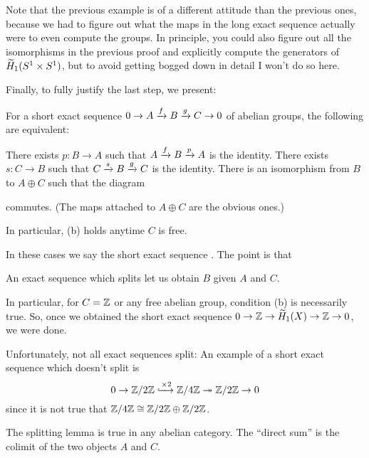 Note that the previous example is of a different attitude than the previous ones,
because we had to figure out what the maps in the long exact sequence actually were
to even compute the groups.
In principle, you could also figure out all the isomorphisms in the previous proof
and explicitly compute the generators of $\widetilde H_1(S^1 \times S^1)$,
but to avoid getting bogged down in detail I won't do so here.

Finally, to fully justify the last step, we present:
\begin{lemma}
	\label{lem:split_exact}
	For a short exact sequence $0 \to A \xrightarrow{f} B \xrightarrow{g} C \to 0$
	of abelian groups, the following are equivalent:
	\begin{enumerate}[(a)]
		\ii There exists $p : B \to A$ such that $A \xrightarrow{f} B \xrightarrow{p} A$ is the identity.
		\ii There exists $s : C \to B$ such that $C \xrightarrow{s} B \xrightarrow{g} C$ is the identity.
		\ii There is an isomorphism from $B$ to $A \oplus C$ such that the diagram
		\begin{center}
		\end{center}
		commutes. (The maps attached to $A \oplus C$ are the obvious ones.)
	\end{enumerate}
	In particular, (b) holds anytime $C$ is free.
\end{lemma}
In these cases we say the short exact sequence . The point is that
\begin{moral}
	An exact sequence which splits let us obtain $B$ given $A$ and $C$.
\end{moral}
In particular, for $C = \mathbb Z$ or any free abelian group,
condition (b) is necessarily true.
So, once we obtained the short exact sequence $0 \to \mathbb Z \to \widetilde H_1(X) \to \mathbb Z \to 0$,
we were done.
\begin{remark}
	Unfortunately, not all exact sequences split:
	An example of a short exact sequence which doesn't split is
	\[ 0 \to \mathbb Z/2\mathbb Z \xhookrightarrow{\times 2} \mathbb Z/4\mathbb Z \twoheadrightarrow \mathbb Z/2\mathbb Z \to 0 \]
	since it is not true that $\mathbb Z/4\mathbb Z \cong \mathbb Z/2\mathbb Z \oplus \mathbb Z/2\mathbb Z$.
\end{remark}
\begin{remark}
	The splitting lemma is true in any abelian category.
	The ``direct sum'' is the colimit of the two objects $A$ and $C$.
\end{remark}

